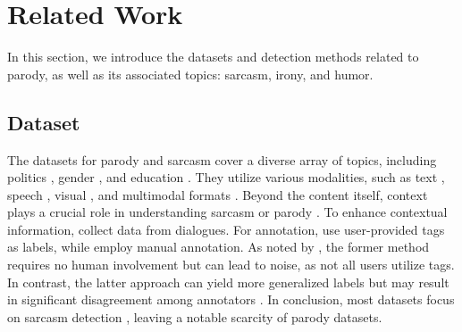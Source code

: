 \section{Related Work}

In this section, we introduce the datasets and detection methods related to parody, as well as its associated topics: sarcasm, irony, and humor.


\subsection{Dataset}\label{sec:rw_dataset}
The datasets for parody and sarcasm cover a diverse array of topics, including politics \citep{topic_politic_Guanchache}, gender \citep{topic_gender_EPIC}, and education \citep{topic_education}. They utilize various modalities, such as text \citep{text_zhang}, speech \citep{speech_ariga}, visual \citep{visual_schif}, and multimodal formats \citep{mm_bedi, mm_maity}. Beyond the content itself, context plays a crucial role in understanding sarcasm or parody \citep{human_wallace}. To enhance contextual information, \citet{dialogue_wang, dialogue_bamman} collect data from dialogues. For annotation, \citet{dialogue_bamman, ptaek2014sarcasm} use user-provided tags as labels, while \citet{riloff2013sarcasm} employ manual annotation. As noted by \citet{survey2024}, the former method requires no human involvement but can lead to noise, as not all users utilize tags. In contrast, the latter approach can yield more generalized labels but may result in significant disagreement among annotators \citep{joshi2016cultural}. In conclusion, most datasets focus on sarcasm detection \citep{topic_politic_Guanchache, text_zhang, mm_maity}, leaving a notable scarcity of parody datasets.

